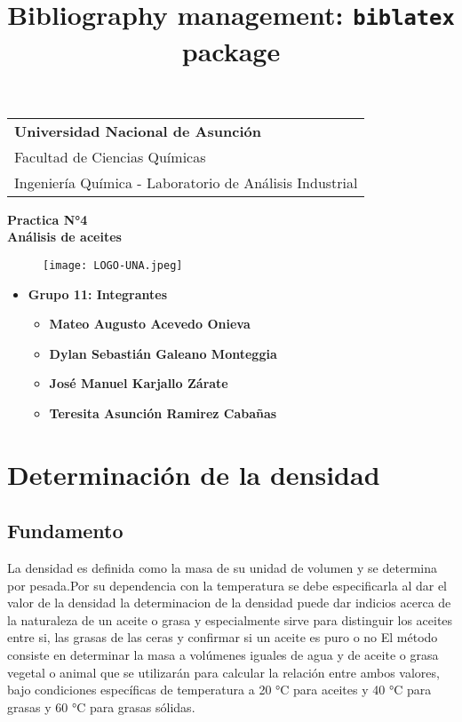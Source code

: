\documentclass[a4paper,12pt]{article} %
\title{Bibliography management: \texttt{biblatex} package}
\begin{document}
\thispagestyle{empty} 
\begin{tabular}{p{15.5cm}}
{\large \bf Universidad Nacional de Asunción} \\
Facultad de Ciencias Químicas \\ 
Ingeniería Química - Laboratorio de Análisis Industrial \\
\hline
\end{tabular} 

\vspace*{0.3cm} %

\begin{center} 
    {\Large \bf Practica N°4  \\ \vspace{3mm} Análisis de aceites}
    \vspace{5mm}
    \begin{figure}[H] 
        \centering
        \texttt{[image: LOGO-UNA.jpeg]}
    \end{figure}
\end{center}  

\vspace{15mm}

\begin{itemize}
    \item \textbf{Grupo 11: Integrantes}
    \begin{itemize}
        \item{\bf Mateo Augusto Acevedo Onieva}
        \item{\bf Dylan Sebastián Galeano Monteggia}
        \item{\bf José Manuel Karjallo Zárate}
        \item{\bf Teresita Asunción Ramirez Cabañas}
    \end{itemize}
\end{itemize}



\newpage

\section{Determinación de la densidad}

\subsection{Fundamento} 
La densidad es definida como la masa de su unidad de volumen y se determina por pesada.Por su dependencia con la temperatura se debe especificarla al dar el valor de la densidad
la determinacion de la densidad puede dar indicios acerca de la naturaleza de un aceite o grasa y especialmente sirve para distinguir los aceites entre si, las grasas de las ceras y confirmar si un aceite es puro o no
El método consiste en determinar la masa a volúmenes iguales de agua y de aceite o grasa vegetal o animal que se utilizarán para calcular la relación entre ambos valores, bajo condiciones específicas de temperatura a 20 °C para aceites y 40 °C para grasas y 60 °C para grasas sólidas. 
\end{document}
